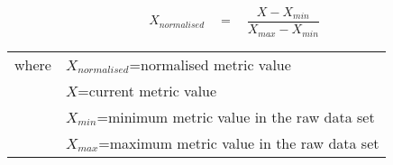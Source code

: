 \begin{equation}
\label{normalisation}
    X_{normalised} \quad = \quad   \frac{X - X_{min}}{X_{max} - X_{min}}
\end{equation}
\begin{tabular}{l l}
     where &$X_{normalised}$\;=\;normalised metric value\\
                &$X$\;=\;current metric value\\
                &$X_{min}$\;=\;minimum metric value in the raw data set \\
                &$X_{max}$\;=\;maximum metric value in the raw data set \\
\end{tabular}\\ \\ 

